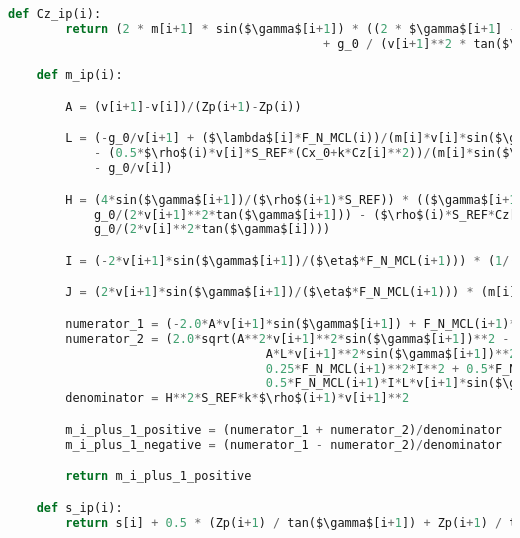 \documentclass[fleqn]{article}
\begin{document}
\begin{lstlisting}[language=Python, firstnumber=last, style = mystyle, mathescape=true]
    def Cz_ip(i):
        return (2 * m[i+1] * sin($\gamma$[i+1]) * ((2 * $\gamma$[i+1] - 2 * $\gamma$[i]) / (Zp(i+1) - Zp(i)) - ($\rho$(i) * S_REF * Cz[i]) / (2 * m[i] * sin($\gamma$[i])) \
                                            + g_0 / (v[i+1]**2 * tan($\gamma$[i+1])) + g_0 / (v[i]**2 * tan($\gamma$[i]))))/($\rho$(i+1) * S_REF)

    def m_ip(i):

        A = (v[i+1]-v[i])/(Zp(i+1)-Zp(i))

        L = (-g_0/v[i+1] + ($\lambda$[i]*F_N_MCL(i))/(m[i]*v[i]*sin($\gamma$[i]))
            - (0.5*$\rho$(i)*v[i]*S_REF*(Cx_0+k*Cz[i]**2))/(m[i]*sin($\gamma$[i]))
            - g_0/v[i])

        H = (4*sin($\gamma$[i+1])/($\rho$(i+1)*S_REF)) * (($\gamma$[i+1]-$\gamma$[i])/(Zp(i+1)-Zp(i)) +
            g_0/(2*v[i+1]**2*tan($\gamma$[i+1])) - ($\rho$(i)*S_REF*Cz[i])/(4*m[i]*sin($\gamma$[i])) +
            g_0/(2*v[i]**2*tan($\gamma$[i])))

        I = (-2*v[i+1]*sin($\gamma$[i+1])/($\eta$*F_N_MCL(i+1))) * (1/(Zp(i+1)-Zp(i)))

        J = (2*v[i+1]*sin($\gamma$[i+1])/($\eta$*F_N_MCL(i+1))) * (m[i]/(Zp(i+1)-Zp(i))) - (v[i+1]*sin($\gamma$[i+1])*$\lambda$[i]*F_N_MCL(i))/(F_N_MCL(i+1)*v[i]*sin($\gamma$[i]))

        numerator_1 = (-2.0*A*v[i+1]*sin($\gamma$[i+1]) + F_N_MCL(i+1)*I + L*v[i+1]*sin($\gamma$[i+1]))
        numerator_2 = (2.0*sqrt(A**2*v[i+1]**2*sin($\gamma$[i+1])**2 - A*F_N_MCL(i+1)*I*v[i+1]*sin($\gamma$[i+1]) -
                                    A*L*v[i+1]**2*sin($\gamma$[i+1])**2 - 0.25*Cx_0*H**2*S_REF**2*k*$\rho$(i+1)**2*v[i+1]**4 +
                                    0.25*F_N_MCL(i+1)**2*I**2 + 0.5*F_N_MCL(i+1)*H**2*J*S_REF*k*$\rho$(i+1)*v[i+1]**2 +
                                    0.5*F_N_MCL(i+1)*I*L*v[i+1]*sin($\gamma$[i+1]) + 0.25*L**2*v[i+1]**2*sin($\gamma$[i+1])**2))
        denominator = H**2*S_REF*k*$\rho$(i+1)*v[i+1]**2

        m_i_plus_1_positive = (numerator_1 + numerator_2)/denominator
        m_i_plus_1_negative = (numerator_1 - numerator_2)/denominator

        return m_i_plus_1_positive 

    def s_ip(i):
        return s[i] + 0.5 * (Zp(i+1) / tan($\gamma$[i+1]) + Zp(i+1) / tan($\gamma$[i]) - Zp(i) / tan($\gamma$[i+1]) - Zp(i) / tan($\gamma$[i]))


\end{lstlisting}
\end{document}
